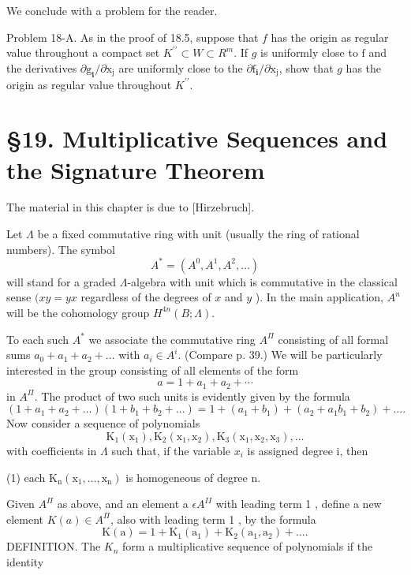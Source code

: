 \documentclass[10pt]{article}
\begin{document}
We conclude with a problem for the reader.

Problem 18-A. As in the proof of 18.5, suppose that $f$ has the origin as regular value throughout a compact set $K^{\prime \prime} \subset W \subset R^{m}$. If $g$ is uniformly close to $\mathrm{f}$ and the derivatives $\partial \mathrm{g}_{\mathbf{i}} / \partial \mathrm{x}_{\mathrm{j}}$ are uniformly close to the $\partial \mathrm{f}_{\mathbf{i}} / \partial \mathrm{x}_{\mathrm{j}}$, show that $g$ has the origin as regular value throughout $K^{\prime \prime}$.

\section{§19. Multiplicative Sequences and the Signature Theorem}
The material in this chapter is due to [Hirzebruch].

Let $\Lambda$ be a fixed commutative ring with unit (usually the ring of rational numbers). The symbol
$$
A^{*}=\left(A^{0}, A^{1}, A^{2}, \ldots\right)
$$
will stand for a graded $\Lambda$-algebra with unit which is commutative in the classical sense $(x y=y x$ regardless of the degrees of $x$ and $y$ ). In the main application, $A^{n}$ will be the cohomology group $H^{4 n}(B ; \Lambda)$.

To each such $A^{*}$ we associate the commutative ring $A^{\Pi}$ consisting of all formal sums $a_{0}+a_{1}+a_{2}+\ldots$ with $a_{i} \in A^{i}$. (Compare p. 39.) We will be particularly interested in the group consisting of all elements of the form
$$
a=1+a_{1}+a_{2}+\cdots
$$
in $A^{\Pi}$. The product of two such units is evidently given by the formula
$$
\left(1+a_{1}+a_{2}+\ldots\right)\left(1+b_{1}+b_{2}+\ldots\right)=1+\left(a_{1}+b_{1}\right)+\left(a_{2}+a_{1} b_{1}+b_{2}\right)+\ldots .
$$
Now consider a sequence of polynomials
$$
\mathrm{K}_{1}\left(\mathrm{x}_{1}\right), \mathrm{K}_{2}\left(\mathrm{x}_{1}, \mathrm{x}_{2}\right), \mathrm{K}_{3}\left(\mathrm{x}_{1}, \mathrm{x}_{2}, \mathrm{x}_{3}\right), \ldots
$$
with coefficients in $\Lambda$ such that, if the variable $x_{i}$ is assigned degree i, then

(1) each $\mathrm{K}_{\mathrm{n}}\left(\mathrm{x}_{1}, \ldots, \mathrm{x}_{\mathrm{n}}\right)$ is homogeneous of degree $\mathrm{n}$.

Given $A^{\Pi}$ as above, and an element a $\epsilon A^{I I}$ with leading term 1 , define a new element $K(a) \in A^{\Pi}$, also with leading term 1 , by the formula
$$
\mathrm{K}(\mathrm{a})=1+\mathrm{K}_{1}\left(\mathrm{a}_{1}\right)+\mathrm{K}_{2}\left(\mathrm{a}_{1}, \mathrm{a}_{2}\right)+\ldots .
$$
DEFINITION. The $K_{n}$ form a multiplicative sequence of polynomials if the identity
\end{document}
